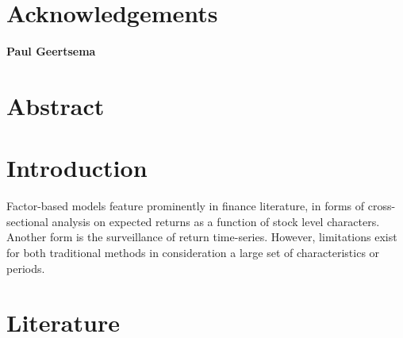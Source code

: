 \documentclass[12pt]{article}
\begin{document}
\section*{Acknowledgements}
\begin{center}
	\textbf{Paul Geertsema}
\end{center}
\newpage
\section*{Abstract}
\newpage
\tableofcontents
\listoffigures
\listoftables
\newpage 
{} 
\section{Introduction}
Factor-based models feature prominently in finance literature, in forms of cross-sectional analysis on expected returns as a function of stock level characters.
Another form is the surveillance of return time-series.
However, limitations exist for both traditional methods in consideration a large set of characteristics or periods.
\newpage
\section{Literature}\label{LR}
\end{document}
